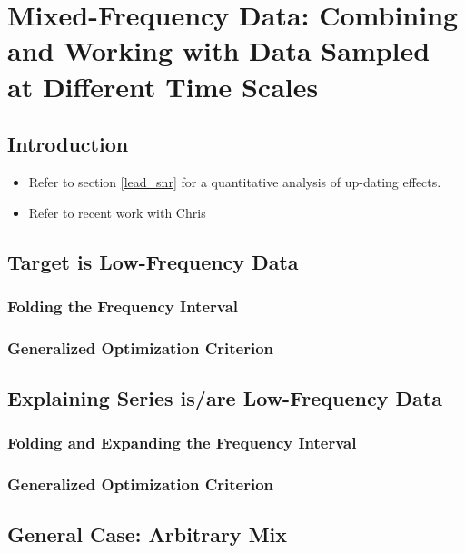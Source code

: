 \documentclass[a4paper]{book}
\begin{document}
\chapter{Mixed-Frequency Data: Combining and Working with Data Sampled at Different Time Scales}
\label{mix_sec}

\section{Introduction}

\begin{itemize}
\item Refer to section \ref{lead_snr} for a quantitative analysis of up-dating effects.
\item Refer to recent work with Chris
\end{itemize}


\section{Target is Low-Frequency Data}


\subsection{Folding the Frequency Interval}

\subsection{Generalized Optimization Criterion}

\section{Explaining Series is/are Low-Frequency Data}

\subsection{Folding and Expanding the Frequency Interval}

\subsection{Generalized Optimization Criterion}

\section{General Case: Arbitrary Mix}
\end{document}
